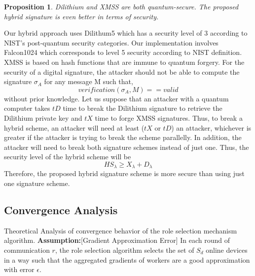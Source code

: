 \documentclass[5p,times]{elsarticle}
\newtheorem{prop}[thm]{Proposition}
\theoremstyle{definition}
\theoremstyle{remark}
\numberwithin{equation}{section}
\begin{document}
\begin{prop}
Dilithium and XMSS are both quantum-secure. The proposed hybrid signature is even better in terms of security.
\end{prop}
Our hybrid approach uses Dilithum5 which has a security level of 3 according to NIST's post-quantum security categories.
Our implementation involves Falcon1024 which corresponds to level 5 security according to NIST definition.
XMSS is based on hash functions that are immune to quantum forgery.
For the security of a digital signature, the attacker should not be able to compute the signature $\sigma_A$ for any message M such that, 
$$verification(\sigma_A, M) == valid$$ without prior knowledge.
Let us suppose that an attacker with a quantum computer takes
$tD$ time to break the Dilithium signature to retrieve the Dilithium private key and $tX$ time to forge XMSS signatures.
Thus, to break a hybrid scheme, an attacker will need at least ($tX$ or $tD$) an attacker, whichever is greater
if the attacker is trying to break the scheme parallelly. 
In addition, the attacker will need to break both signature schemes instead of just one.
Thus, the security level of the hybrid scheme will be $$ HS_\lambda \geq X_\lambda + D_\lambda$$
Therefore, the proposed hybrid signature scheme is more secure than using just one signature scheme.



\subsection{Convergence Analysis}
Theoretical Analysis of convergence behavior of the role selection mechanism algorithm.
\textbf{Assumption:}[Gradient Approximation Error]
In each round of communication $r$, the role selection algorithm selects the set of $S_d$ online devices in a way such that the aggregated gradients of workers are a good approximation with error $\epsilon$.
\end{document}
